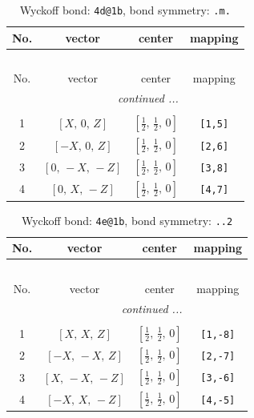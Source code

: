 \documentclass[fleqn,8pt]{jsarticle}
\begin{document}
\begin{longtable}{cccc}
\caption{Wyckoff bond: {\tt 4d@1b}, bond symmetry: {\tt .m.}}
 \\
 \hline \hline
No. & vector & center & mapping \\ \hline \endfirsthead

\multicolumn{3}{l}{\tablename\ \thetable{}} \\
 \hline \hline
No. & vector & center & mapping \\ \hline \endhead

 \hline \hline
\multicolumn{3}{r}{\footnotesize\it continued ...} \\ \endfoot

 \hline \hline
\multicolumn{3}{r}{} \\ \endlastfoot

1 & $\left[ X,\, 0,\, Z \right]$ & $\left[ \frac{1}{2},\, \frac{1}{2},\, 0 \right]$ & {\tt [1,5]} \\ \hline
2 & $\left[ - X,\, 0,\, Z \right]$ & $\left[ \frac{1}{2},\, \frac{1}{2},\, 0 \right]$ & {\tt [2,6]} \\ \hline
3 & $\left[ 0,\, - X,\, - Z \right]$ & $\left[ \frac{1}{2},\, \frac{1}{2},\, 0 \right]$ & {\tt [3,8]} \\ \hline
4 & $\left[ 0,\, X,\, - Z \right]$ & $\left[ \frac{1}{2},\, \frac{1}{2},\, 0 \right]$ & {\tt [4,7]} \\
\end{longtable}
\renewcommand{\arraystretch}{1.2}
\begin{longtable}{cccc}
\caption{Wyckoff bond: {\tt 4e@1b}, bond symmetry: {\tt ..2}}
 \\
 \hline \hline
No. & vector & center & mapping \\ \hline \endfirsthead

\multicolumn{3}{l}{\tablename\ \thetable{}} \\
 \hline \hline
No. & vector & center & mapping \\ \hline \endhead

 \hline \hline
\multicolumn{3}{r}{\footnotesize\it continued ...} \\ \endfoot

 \hline \hline
\multicolumn{3}{r}{} \\ \endlastfoot

1 & $\left[ X,\, X,\, Z \right]$ & $\left[ \frac{1}{2},\, \frac{1}{2},\, 0 \right]$ & {\tt [1,-8]} \\ \hline
2 & $\left[ - X,\, - X,\, Z \right]$ & $\left[ \frac{1}{2},\, \frac{1}{2},\, 0 \right]$ & {\tt [2,-7]} \\ \hline
3 & $\left[ X,\, - X,\, - Z \right]$ & $\left[ \frac{1}{2},\, \frac{1}{2},\, 0 \right]$ & {\tt [3,-6]} \\ \hline
4 & $\left[ - X,\, X,\, - Z \right]$ & $\left[ \frac{1}{2},\, \frac{1}{2},\, 0 \right]$ & {\tt [4,-5]} \\
\end{longtable}
\end{document}
